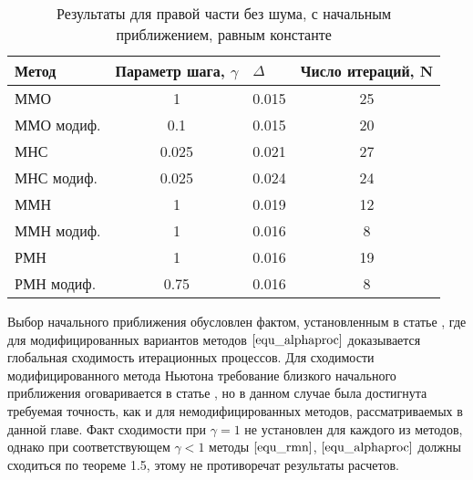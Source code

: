 \begin{table}[h]
	\centering
	\renewcommand{\arraystretch}{1.5}
	\caption{Результаты для правой части без шума, с начальным приближением, равным константе}
	\label{table1.2}
	\begin{tabular}{|l|c|c|c|}
		\hline
		\textbf{Метод}                   & \multicolumn{1}{l|}{\textbf{Параметр шага, $\gamma$}} & \multicolumn{1}{l|}{\textbf{$\Delta$}} & \multicolumn{1}{l|}{\textbf{Число итераций, N}} \\ \hline
		ММО                              & 1                                                     & 0.015                                  & 25                                              \\ \hline
		\multicolumn{1}{|r|}{ММО модиф.} & 0.1                                                   & 0.015                                  & 20                                              \\ \hline
		МНС                              & 0.025                                                 & 0.021                                  & 27                                              \\ \hline
		МНС модиф.                       & 0.025                                                 & 0.024                                  & 24                                              \\ \hline
		ММН                              & 1                                                     & 0.019                                  & 12                                              \\ \hline
		ММН модиф.                       & 1                                                     & 0.016                                  & 8                                               \\ \hline
		РМН                              & 1                                                     & 0.016                                  & 19                                              \\ \hline
		РМН модиф.                       & 0.75                                                  & 0.016                                  & 8                                               \\ \hline
	\end{tabular}
\end{table}

Выбор начального приближения обусловлен фактом, установленным в статье \cite{Vasin2016}, где для модифицированных вариантов методов $\eqref{equ_alphaproc}$ доказывается глобальная сходимость итерационных процессов. Для сходимости модифицированного метода Ньютона требование близкого начального приближения оговаривается в статье \cite{VasAkiMin2013}, но в данном случае была достигнута требуемая точность, как и для немодифицированных методов, рассматриваемых в данной главе. Факт сходимости при $\gamma=1$ не установлен для каждого из методов, однако при соответствующем $\gamma<1$ методы $\eqref{equ_rmn}$, $\eqref{equ_alphaproc}$ должны сходиться по теореме 1.5, этому не противоречат результаты расчетов.

